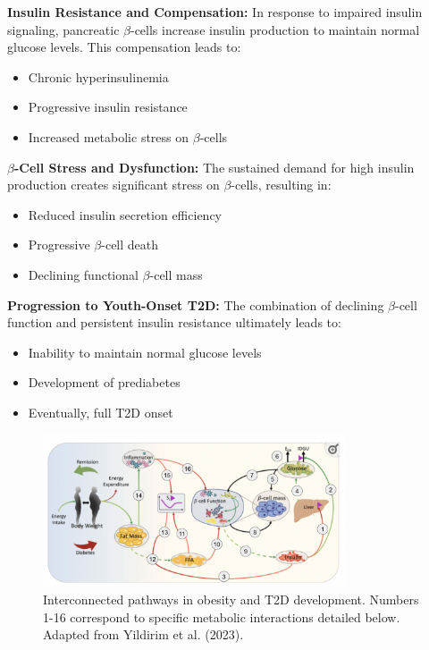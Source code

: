 \begin{multicols}{2}
\textbf{Insulin Resistance and Compensation:} In response to impaired insulin signaling, pancreatic $\beta$-cells increase insulin production to maintain normal glucose levels. This compensation leads to:
\begin{itemize}
    \item Chronic hyperinsulinemia
    \item Progressive insulin resistance
    \item Increased metabolic stress on $\beta$-cells
\end{itemize}

\textbf{$\beta$-Cell Stress and Dysfunction:} The sustained demand for high insulin production creates significant stress on $\beta$-cells, resulting in:
\begin{itemize}
    \item Reduced insulin secretion efficiency
    \item Progressive $\beta$-cell death
    \item Declining functional $\beta$-cell mass
\end{itemize}

\textbf{Progression to Youth-Onset T2D:} The combination of declining $\beta$-cell function and persistent insulin resistance ultimately leads to:
\begin{itemize}
    \item Inability to maintain normal glucose levels
    \item Development of prediabetes
    \item Eventually, full T2D onset
\end{itemize}

\end{multicols}

\begin{figure}[h]
\centering
\includegraphics[width=0.8\textwidth]{images/obesity_and_t2d_diagram.png}
\caption{Interconnected pathways in obesity and T2D development. Numbers 1-16 correspond to specific metabolic interactions detailed below. Adapted from Yildirim et al. (2023)\cite{Yildirim2023}.}
\label{fig:pathways}
\end{figure}

